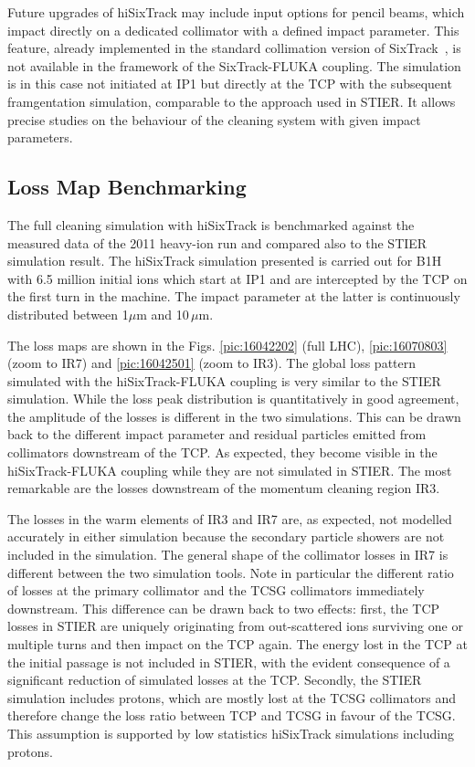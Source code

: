 Future upgrades of hiSixTrack may include input options for pencil beams, which impact directly on a dedicated collimator with a defined impact parameter. This feature, already implemented in the standard collimation version of SixTrack~\cite{bruce_cwg:166}, is not available in the framework of the SixTrack-FLUKA coupling. The simulation is in this case not initiated at IP1 but directly at the TCP with the subsequent framgentation simulation, comparable to the approach used in STIER. It allows precise studies on the behaviour of the cleaning system with given impact parameters.




\subsection{Loss Map Benchmarking} \label{lm:benchmark}


The full cleaning simulation with hiSixTrack is benchmarked against the measured data of the 2011 heavy-ion run and compared also to the STIER simulation result. The hiSixTrack simulation presented is carried out for B1H with 6.5 million initial \lead ions which start at IP1 and are intercepted by the TCP on the first turn in the machine. The impact parameter at the latter is continuously distributed between 1$\mu$m and 10$\,\mu$m. 

The loss maps are shown in the Figs. \ref{pic:16042202} (full LHC), \ref{pic:16070803} (zoom to IR7) and \ref{pic:16042501} (zoom to IR3). The global loss pattern simulated with the hiSixTrack-FLUKA coupling is very similar to the STIER simulation. While the loss peak distribution is quantitatively in good agreement, the amplitude of the losses is different in the two simulations. This can be drawn back to the different impact parameter and residual particles emitted from collimators downstream of the TCP. As expected, they become visible in the hiSixTrack-FLUKA coupling while they are not simulated in STIER. The most remarkable are the losses downstream of the momentum cleaning region IR3. 

The losses in the warm elements of IR3 and IR7 are, as expected, not modelled accurately in either simulation because the secondary particle showers are not included in the simulation. The general shape of the collimator losses in IR7 is different between the two simulation tools. Note in particular the different ratio of losses at the primary collimator and the TCSG collimators immediately downstream. This difference can be drawn back to two effects: first, the TCP losses in STIER are uniquely originating from out-scattered \lead ions surviving one or multiple turns and then impact on the TCP again. The energy lost in the TCP at the initial passage is not included in STIER, with the evident consequence of a significant reduction of simulated losses at the TCP. Secondly, the STIER simulation includes protons, which are mostly lost at the TCSG collimators and therefore change the loss ratio between TCP and TCSG in favour of the TCSG. This assumption is supported by low statistics hiSixTrack simulations including protons. 

